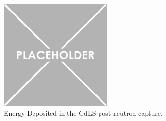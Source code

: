 \begin{figure}
    \centering
    \includegraphics[width=0.5\textwidth]{Figures/Placeholder.png}
    \caption{Energy Deposited in the GdLS post-neutron capture.}
    \label{fig:GdLS_energy_deposits_post_capture}
\end{figure}

